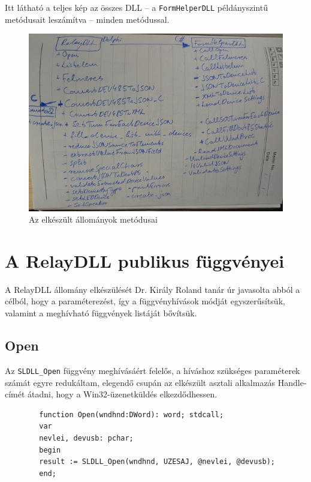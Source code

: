 \documentclass[tocnopagenum]{thesis-ekf}
\begin{document}
	Itt látható a teljes kép az összes DLL -- a \verb*|FormHelperDLL| példányszintű metódusait leszámítva -- minden metódussal.
	\begin{figure}[h!]
	\centering
	\hspace*{-0.5in}
	\includegraphics[scale=0.7]{images/fuggvenyek_kezi.jpg}
	\caption{Az elkészült állományok metódusai}
	\label{fig:fuggvenyek_kezi}
	\end{figure}
	\section{A RelayDLL publikus függvényei}
	A RelayDLL állomány elkészülését Dr. Király Roland tanár úr javasolta abból a célból, hogy a paraméterezést, így a függvényhívások módját egyszerűsítsük, valamint a meghívható függvények listáját bővítsük.
	\subsection{Open} Az \verb*|SLDLL_Open| függvény meghívásáért felelős, a híváshoz szükséges paraméterek számát egyre redukáltam, elegendő csupán az elkészült asztali alkalmazás Handle-címét átadni, hogy a Win32-üzenetküldés elkezdődhessen.
	
	\begin{verbatim}
		function Open(wndhnd:DWord): word; stdcall;
		var
		nevlei, devusb: pchar;
		begin
		result := SLDLL_Open(wndhnd, UZESAJ, @nevlei, @devusb); 
		end;
	\end{verbatim}
\end{document}

